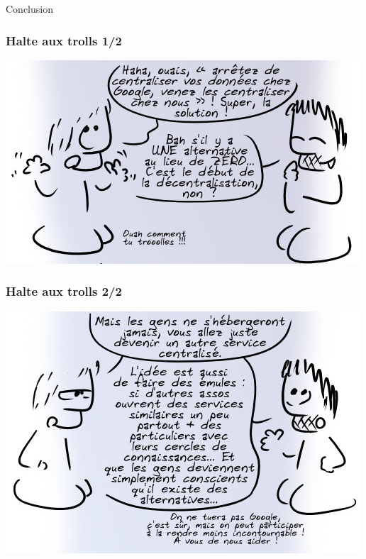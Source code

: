 \documentclass{beamer}
\begin{document}
\begin{frame}
\Huge{\centerline{Conclusion}}
\end{frame}

\begin{frame}
\frametitle{Halte aux trolls 1/2}

\begin{center}
\includegraphics[scale=0.5]{./images/troll.jpg}
\end{center}
\end{frame}

\begin{frame}
\frametitle{Halte aux trolls 2/2}

\begin{center}
\includegraphics[scale=0.5]{./images/troll2.jpg}
\end{center}
\end{frame}
\end{document}
